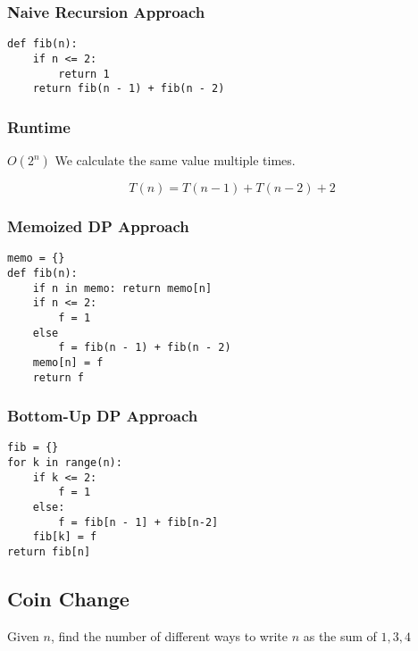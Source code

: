 \documentclass{article}
\begin{document}
\subsubsection*{Naive Recursion Approach}
\begin{verbatim}
def fib(n):
    if n <= 2:
        return 1
    return fib(n - 1) + fib(n - 2)
\end{verbatim}

\subsubsection*{Runtime} \(O(2^n)\)
We calculate the same value multiple times.

\begin{equation*}
    T(n) = T(n - 1) + T(n - 2) + 2
\end{equation*}

\subsubsection*{Memoized DP Approach}
\begin{verbatim}
memo = {}
def fib(n):
    if n in memo: return memo[n]
    if n <= 2:
        f = 1
    else
        f = fib(n - 1) + fib(n - 2)
    memo[n] = f
    return f
\end{verbatim}

\subsubsection*{Bottom-Up DP Approach}
\begin{verbatim}
fib = {}
for k in range(n):
    if k <= 2:
        f = 1
    else:
        f = fib[n - 1] + fib[n-2]
    fib[k] = f
return fib[n]
\end{verbatim}

\subsection*{Coin Change}
Given $n$, find the number of different ways to write $n$ as the sum of \(1, 3,
4\)
\end{document}
